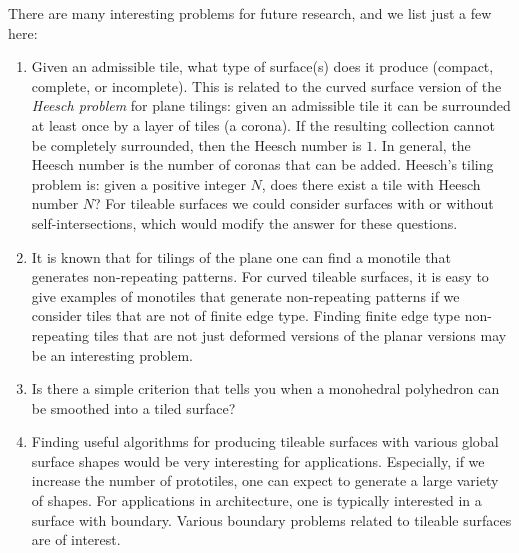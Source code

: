 \documentclass[11pt]{amsart}
\theoremstyle{remark}
\begin{document}
There are many interesting problems for future research, and we list just a few here:
\begin{enumerate}
\item Given an admissible tile, what type of surface(s) does it produce (compact, complete, or incomplete). 
This is related to the curved  surface version  of the \emph{Heesch problem} \cite{heesch1968regulares} \cite{mann2004heesch} for plane tilings: given an admissible tile it can be surrounded at least once by a layer of tiles 
(a corona).  If the resulting collection cannot be completely surrounded, then the Heesch number is $1$.  In general, the Heesch number is the number of coronas that can be added.  Heesch's tiling problem is: given a positive integer $N$, does there exist a tile with Heesch number $N$? For tileable surfaces we could consider surfaces with or without self-intersections, which would modify the answer for these questions.
\item
It is known that for tilings of the plane one can find a monotile that generates non-repeating patterns.  
For curved tileable surfaces, it is easy to give examples of monotiles that generate non-repeating patterns if 
we consider tiles that are not of finite edge type.  Finding finite edge type non-repeating tiles that are not just deformed  versions of the planar versions may be an interesting problem.
\item 
Is there a simple criterion that tells you when a monohedral polyhedron can be smoothed into a tiled surface?
\item Finding useful algorithms for producing tileable surfaces with various global surface shapes would be very interesting for applications.  Especially, if we increase the number of prototiles, one can expect to generate a large variety of shapes. 
For applications in architecture, one is typically interested in a surface with boundary.  Various boundary problems related to tileable surfaces are of interest.
\end{enumerate}









\end{document}

